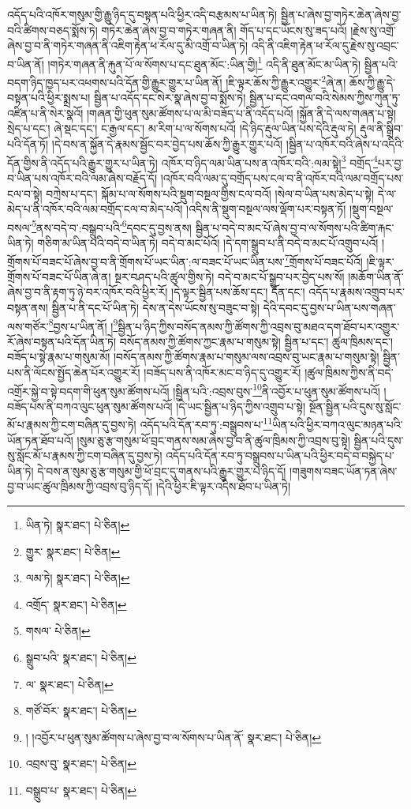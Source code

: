 འདོད་པའི་འཁོར་གསུམ་གྱི་རྒྱུ་ཉིད་དུ་བསྟན་པའི་ཕྱིར་འདི་བརྩམས་པ་ཡིན་ཏེ། སྦྱིན་པ་ཞེས་བྱ་གཏེར་ཆེན་ཞེས་བྱ་བའི་ཚིགས་བཅད་སྨོས་ཏེ། གཏེར་ཆེན་ཞེས་བྱ་བ་གཏེར་གཞན་ནི། གོད་པ་དང་ཡོངས་སུ་ཟད་པའོ། །རྗེས་སུ་འགྲོ་ཞེས་བྱ་བ་ནི་གཏེར་གཞན་ནི་འཇིག་རྟེན་ཕ་རོལ་དུ་མི་འགྲོ་བ་ཡིན་ཏེ། འདི་ནི་འཇིག་རྟེན་ཕ་རོལ་དུ་རྗེས་སུ་འབྲང་བ་ཡིན་ནོ། །གཏེར་གཞན་ནི་རྐུན་པོ་ལ་སོགས་པ་དང་ཐུན་མོང་:ཡིན་གྱི།\footnote{ཡིན་ཏེ།  སྣར་ཐང་།  པེ་ཅིན། } འདི་ནི་ཐུན་མོང་མ་ཡིན་ཏེ། སྦྱིན་པའི་བདག་ཉིད་ཁྱད་པར་འཕགས་པའི་དོན་གྱི་རྒྱུར་གྱུར་པ་ཡིན་ནོ། །ཇི་ལྟར་ཆོས་ཀྱི་རྒྱུར་འགྱུར་\footnote{གྱུར་  སྣར་ཐང་།  པེ་ཅིན། }ཞེ་ན། ཆོས་ཀྱི་རྒྱུ་དེ་བསྟན་པའི་ཕྱིར་སྨྲས་པ། སྦྱིན་པ་འདོད་དང་སེར་སྣ་ཞེས་བྱ་བ་སྨོས་ཏེ། སྦྱིན་པ་དང་འགལ་བའི་སེམས་ཀྱིས་ཀུན་ཏུ་འཛིན་པ་ནི་སེར་སྣའོ། །གཞན་གྱི་ཕུན་སུམ་ཚོགས་པ་ལ་མི་བཟོད་པ་ནི་འདོད་པའོ། །སྐྱོན་ནི་དེ་ལས་གཞན་པ་སྟེ། སྲེད་པ་དང་། ཞེ་སྡང་དང་། ང་རྒྱལ་དང་། མ་རིག་པ་ལ་སོགས་པའོ། །དེ་ཉིད་རྡུལ་ཡིན་པས་དེའི་རྡུལ་ཏེ། རྡུལ་ནི་སྒྲིབ་པའི་དོན་ཏོ། །དེ་བས་ན་སྐྱོན་དེ་རྣམས་སྦྱོང་བར་བྱེད་པས་ཆོས་ཀྱི་རྒྱུར་གྱུར་པའོ། །སྦྱིན་པ་འཁོར་བའི་ཞེས་པ་འདིའི་དོན་གྱིས་ནི་འདོད་པའི་རྒྱུར་གྱུར་པ་ཡིན་ཏེ། འཁོར་བ་ཉིད་ལམ་ཡིན་པས་ན་འཁོར་བའི་:ལམ་སྟེ།\footnote{ལམ་ཏེ།  སྣར་ཐང་།  པེ་ཅིན། } བགྲོད་\footnote{འགྲོད་  སྣར་ཐང་།  པེ་ཅིན། }པར་བྱ་བ་ཡིན་པས་འཁོར་བའི་ལམ་ཞེས་བརྗོད་དོ། །འཁོར་བའི་ལམ་དུ་བགྲོད་པས་ངལ་བ་ནི་འཁོར་བའི་ལམ་བགྲོད་པས་ངལ་བ་སྟེ། བཀྲེས་པ་དང་། སྐོམ་པ་ལ་སོགས་པའི་སྡུག་བསྔལ་གྱིས་ངལ་བའོ། །སེལ་བ་ཡིན་པས་མེད་པ་སྟེ། དེ་ལ་མེད་པ་ནི་འཁོར་བའི་ལམ་བགྲོད་ངལ་བ་མེད་པའོ། །འདིས་ནི་སྡུག་བསྔལ་ལས་ལྡོག་པར་བསྟན་ཏོ། །སྡུག་བསྔལ་བསལ་\footnote{གསལ་  པེ་ཅིན། }ནས་བདེ་བ་:བསྒྲུབ་པའི་\footnote{སྒྲུབ་པའི་  སྣར་ཐང་།  པེ་ཅིན། }དབང་དུ་བྱས་ནས། སྦྱིན་པ་བདེ་བ་མང་པོ་ཞེས་བྱ་བ་ལ་སོགས་པའི་ཚིག་རྐང་ཡིན་ཏེ། གཅིག་མ་ཡིན་པའི་བདེ་བ་ཡིན་ཏེ། བདེ་བ་མང་པོའོ། །དེ་དག་སྒྲུབ་པ་ནི་བདེ་བ་མང་པོ་འགྲུབ་པའོ། །གྲོགས་པོ་བཟང་པོ་ཞེས་བྱ་བ་ནི་གྲོགས་པོ་ཡང་ཡིན་:ལ་བཟང་པོ་ཡང་ཡིན་པས་\footnote{ལ་  སྣར་ཐང་།  པེ་ཅིན། }གྲོགས་པོ་བཟང་པོའོ། །ཇི་ལྟར་གྲོགས་པོ་བཟང་པོ་ཡིན་ཞེ་ན། སྔར་བཤད་པའི་ཚུལ་གྱིས་ཏེ། བདེ་བ་མང་པོ་སྒྲུབ་པར་བྱེད་པས་སོ། །མཆོག་ཡིན་ནོ་ཞེས་བྱ་བ་ནི་རྟག་ཏུ་ཉེ་བར་འཁོར་བའི་ཕྱིར་རོ། །དེ་ལྟར་སྦྱིན་པས་ཆོས་དང་། དོན་དང་། འདོད་པ་རྣམས་འགྲུབ་པར་བསྟན་ནས། སྦྱིན་པ་ནི་དང་པོ་ཡིན་ཏེ། དེས་ན་དེས་ཡོངས་སུ་བཟུང་བ་སྟེ། དེའི་དབང་དུ་བྱས་པ་ཡིན་པས་གཞན་ལས་གཙོར་\footnote{གཙོ་བོར་  སྣར་ཐང་།  པེ་ཅིན། }བྱས་པ་ཡིན་ནོ། །\footnote{། །འབྱོར་པ་ཕུན་སུམ་ཚོགས་པ་ཞེས་བྱ་བ་ལ་སོགས་པ་ཡིན་ནོ་  སྣར་ཐང་།  པེ་ཅིན། }སྦྱིན་པ་ཉིད་ཀྱིས་བསོད་ནམས་ཀྱི་ཚོགས་ཀྱི་འབྲས་བུ་མཐའ་དག་ཐོབ་པར་འགྱུར་རོ་ཞེས་བསྟན་པའི་དོན་ཡིན་ཏེ། བསོད་ནམས་ཀྱི་ཚོགས་ཀྱང་རྣམ་པ་གསུམ་སྟེ། སྦྱིན་པ་དང་། ཚུལ་ཁྲིམས་དང་། བཟོད་པ་སྟེ་རྣམ་པ་གསུམ་མོ། །བསོད་ནམས་ཀྱི་ཚོགས་རྣམ་པ་གསུམ་ལས་འབྲས་བུ་ཡང་རྣམ་པ་གསུམ་སྟེ། སྦྱིན་པས་ནི་ལོངས་སྤྱོད་ཆེན་པོར་འགྱུར་རོ། །བཟོད་པས་ནི་འཁོར་མང་བ་ཉིད་དུ་འགྱུར་རོ། །ཚུལ་ཁྲིམས་ཀྱིས་ནི་བདེ་འགྲོར་སྐྱེ་བ་སྟེ་བདག་གི་ཕུན་སུམ་ཚོགས་པའོ། །སྦྱིན་པའི་:འབྲས་བུས་\footnote{འབྲས་བུ་  སྣར་ཐང་།  པེ་ཅིན། }ནི་འབྱོར་པ་ཕུན་སུམ་ཚོགས་པའོ། །བཟོད་པས་ནི་བཀའ་ལུང་ཕུན་སུམ་ཚོགས་པའོ། །དེ་ཡང་སྦྱིན་པ་ཉིད་ཀྱིས་འགྲུབ་པ་སྟེ། སྔོན་སྦྱིན་པའི་དུས་སུ་སློང་མོ་པ་རྣམས་ཀྱི་ངག་བཞིན་དུ་བྱས་ཏེ། འདོད་པའི་དོན་རབ་ཏུ་:བསྒྲུབས་པ་\footnote{བསྒྲུབ་པ་  སྣར་ཐང་།  པེ་ཅིན། }ཡིན་པའི་ཕྱིར་བཀའ་ལུང་མཉན་པའི་ཡོན་ཏན་ཐོབ་པའོ། །སུམ་ཅུ་རྩ་གསུམ་ཕོ་བྲང་གནས་སམ་ཞེས་བྱ་བ་ནི་ཚུལ་ཁྲིམས་ཀྱི་འབྲས་བུ་སྟེ། སྦྱིན་པའི་དུས་སུ་སློང་མོ་པ་རྣམས་ཀྱི་ངག་བཞིན་དུ་བྱས་ཏེ། འདོད་པའི་དོན་རབ་ཏུ་བསྒྲུབས་པ་ཡིན་པའི་ཕྱིར་བདེ་བ་བསྐྱེད་པ་ཡིན་ཏེ། དེ་བས་ན་སུམ་ཅུ་རྩ་གསུམ་གྱི་ཕོ་བྲང་དུ་གནས་པའི་རྒྱུར་གྱུར་པ་ཉིད་དོ། །གཟུགས་བཟང་ཡོན་ཏན་ཞེས་བྱ་བ་ཡང་ཚུལ་ཁྲིམས་ཀྱི་འབྲས་བུ་ཉིད་དོ། །དེའི་ཕྱིར་ཇི་ལྟར་འདིས་ཐོབ་པ་ཡིན་ཏེ། 